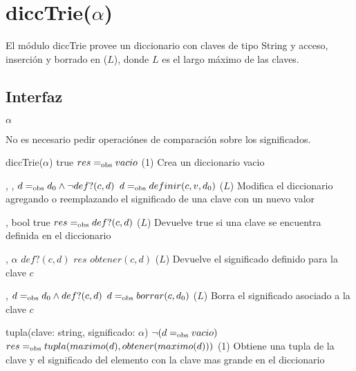 \section{diccTrie($\alpha$)}

El módulo diccTrie provee un diccionario con claves de tipo String y acceso, inserción y borrado en \bigo($L$), donde $L$ es el largo máximo de las claves.

\subsection{Interfaz}

\begin{iparamformales}{$\alpha$}

No es necesario pedir operaciónes de comparación sobre los significados.

\end{iparamformales}

\iusa{}
\ioperaciones

{}
{diccTrie($\alpha$)}
{true}
{$res =_{\mathrm{obs}} vacio$}
{\bigo(1)}
{}
{Crea un diccionario vacio}

{   ,
    ,
    }
{}
{$d =_{\mathrm{obs}} d_0 \land \neg def?(c,d)$}
{$d =_{\mathrm{obs}} definir(c, v, d_0)$}
{\bigo($L$)}
{}
{Modifica el diccionario agregando o reemplazando el significado de una clave
    con un nuevo valor}

{   ,
    }
{bool}
{true}
{$res =_{\mathrm{obs}} def?(c, d)$}
{\bigo($L$)}
{}
{Devuelve true si una clave se encuentra definida en el diccionario}

{   ,
    }
{$\alpha$}
{$def?(c, d)$}
{$res$ \igobs $obtener(c, d)$}
{\bigo($L$)}
{}
{Devuelve el significado definido para la clave $c$}

{   ,
    }
{}
{$d =_{\mathrm{obs}} d_0 \land def?(c, d)$}
{$d =_{\mathrm{obs}} borrar(c, d_0)$}
{\bigo($L$)}
{}
{Borra el significado asociado a la clave $c$}

{   }
{tupla(clave: string, significado: $\alpha$)}
{$\neg (d =_{\mathrm{obs}} vacio)$}
{$res =_{\mathrm{obs}} tupla(maximo(d), obtener(maximo(d)))$}
{\bigo(1)}
{}
{Obtiene una tupla de la clave y el significado del elemento con la clave
    mas grande en el diccionario}

